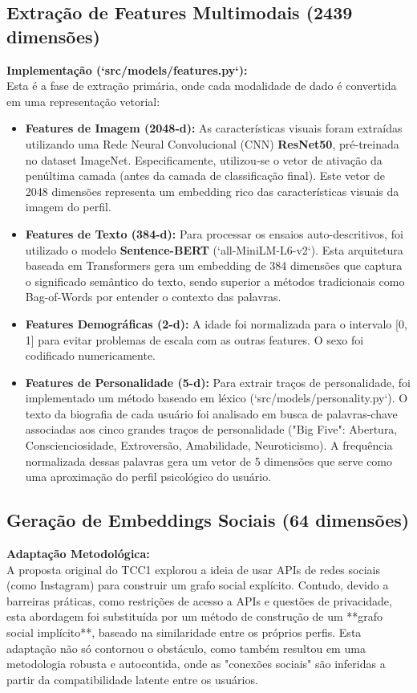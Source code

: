 \subsection{Extração de Features Multimodais (2439 dimensões)}
\textbf{Implementação (`src/models/features.py`):} \\
Esta é a fase de extração primária, onde cada modalidade de dado é convertida em uma representação vetorial:
\begin{itemize}
    \item \textbf{Features de Imagem (2048-d):} As características visuais foram extraídas utilizando uma Rede Neural Convolucional (CNN) \textbf{ResNet50}, pré-treinada no dataset ImageNet. Especificamente, utilizou-se o vetor de ativação da penúltima camada (antes da camada de classificação final). Este vetor de 2048 dimensões representa um embedding rico das características visuais da imagem do perfil.
    \item \textbf{Features de Texto (384-d):} Para processar os ensaios auto-descritivos, foi utilizado o modelo \textbf{Sentence-BERT} (`all-MiniLM-L6-v2`). Esta arquitetura baseada em Transformers gera um embedding de 384 dimensões que captura o significado semântico do texto, sendo superior a métodos tradicionais como Bag-of-Words por entender o contexto das palavras.
    \item \textbf{Features Demográficas (2-d):} A idade foi normalizada para o intervalo [0, 1] para evitar problemas de escala com as outras features. O sexo foi codificado numericamente.
    \item \textbf{Features de Personalidade (5-d):} Para extrair traços de personalidade, foi implementado um método baseado em léxico (`src/models/personality.py`). O texto da biografia de cada usuário foi analisado em busca de palavras-chave associadas aos cinco grandes traços de personalidade ("Big Five": Abertura, Conscienciosidade, Extroversão, Amabilidade, Neuroticismo). A frequência normalizada dessas palavras gera um vetor de 5 dimensões que serve como uma aproximação do perfil psicológico do usuário.
\end{itemize}

\subsection{Geração de Embeddings Sociais (64 dimensões)}
\textbf{Adaptação Metodológica:} \\
A proposta original do TCC1 explorou a ideia de usar APIs de redes sociais (como Instagram) para construir um grafo social explícito. Contudo, devido a barreiras práticas, como restrições de acesso a APIs e questões de privacidade, esta abordagem foi substituída por um método de construção de um **grafo social implícito**, baseado na similaridade entre os próprios perfis. Esta adaptação não só contornou o obstáculo, como também resultou em uma metodologia robusta e autocontida, onde as "conexões sociais" são inferidas a partir da compatibilidade latente entre os usuários.

